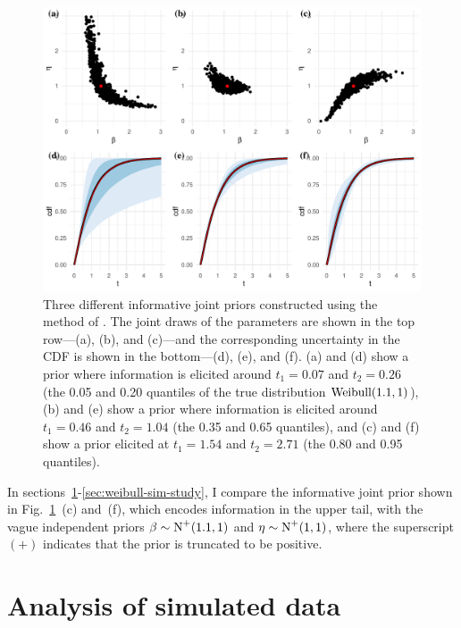 \begin{figure}
    \centering
    \includegraphics[width=1\textwidth]{./figures/ch-2/joint-priors.pdf}
    \caption{Three different informative joint priors constructed using the method of \citet{kaminskiy2005}. The joint draws of the parameters are shown in the top row---(a), (b), and (c)---and the corresponding uncertainty in the CDF is shown in the bottom---(d), (e), and (f). (a) and (d) show a prior where information is elicited around $t_1 = 0.07$ and $t_2 = 0.26$ (the 0.05 and 0.20 quantiles of the true distribution $\hbox{Weibull}(1.1, 1)$), (b) and (e) show a prior where information is elicited around $t_1 = 0.46$ and $t_2 = 1.04$ (the 0.35 and 0.65 quantiles), and (c) and (f) show a prior elicited at $t_1 = 1.54$ and $t_2 = 2.71$ (the 0.80 and 0.95 quantiles).}
    \label{fig:kaminskiy-join-priors}
\end{figure}

In sections~\ref{sec:weibull-sim-example}-\ref{sec:weibull-sim-study}, I compare the informative joint prior shown in Fig.~\ref{fig:kaminskiy-join-priors}~(c) and~(f), which encodes information in the upper tail, with the vague independent priors $\beta \sim \hbox{N}^{+}(1.1, 1)$ and $\eta \sim \hbox{N}^{+}(1, 1)$, where the superscript $(+)$ indicates that the prior is truncated to be positive. 

\section{Analysis of simulated data} \label{sec:weibull-sim-example}

